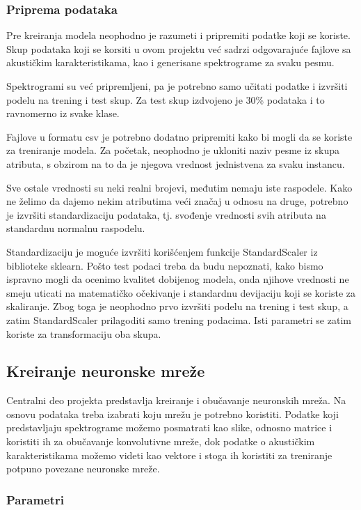 \documentclass{article}
\begin{document}
\subsubsection{Priprema podataka}

Pre kreiranja modela neophodno je razumeti i pripremiti podatke koji se koriste. Skup podataka koji se korsiti u ovom projektu već sadrzi odgovarajuće fajlove sa akustičkim karakteristikama, kao i generisane spektrograme za svaku pesmu.

Spektrogrami su već pripremljeni, pa je potrebno samo učitati podatke i izvršiti podelu na trening i test skup. Za test skup izdvojeno je 30\% podataka i to ravnomerno iz svake klase.

Fajlove u formatu csv je potrebno dodatno pripremiti kako bi mogli da se koriste za treniranje modela. Za početak, neophodno je ukloniti naziv pesme iz skupa atributa, s obzirom na to da je njegova vrednost jednistvena za svaku instancu.

Sve ostale vrednosti su neki realni brojevi, međutim nemaju iste raspodele. Kako ne želimo da dajemo nekim atributima veći značaj u odnosu na druge, potrebno je izvršiti standardizaciju podataka, tj. svođenje vrednosti svih atributa na standardnu normalnu raspodelu.

Standardizaciju je moguće izvršiti korišćenjem funkcije StandardScaler iz biblioteke sklearn. Pošto test podaci treba da budu nepoznati, kako bismo ispravno mogli da ocenimo kvalitet dobijenog modela, onda njihove vrednosti ne smeju uticati na matematičko očekivanje i standardnu devijaciju koji se koriste za skaliranje. Zbog toga je neophodno prvo izvršiti podelu na trening i test skup, a zatim StandardScaler prilagoditi samo trening podacima. Isti parametri se zatim koriste za transformaciju oba skupa.

\subsection{Kreiranje neuronske mreže}

Centralni deo projekta predstavlja kreiranje i obučavanje neuronskih mreža. Na osnovu podataka treba izabrati koju mrežu je potrebno koristiti. Podatke koji predstavljaju spektrograme možemo posmatrati kao slike, odnosno matrice i koristiti ih za obučavanje konvolutivne mreže, dok podatke o akustičkim karakteristikama možemo videti kao vektore i stoga ih koristiti za treniranje potpuno povezane neuronske mreže.

\subsubsection{Parametri}
\end{document}
